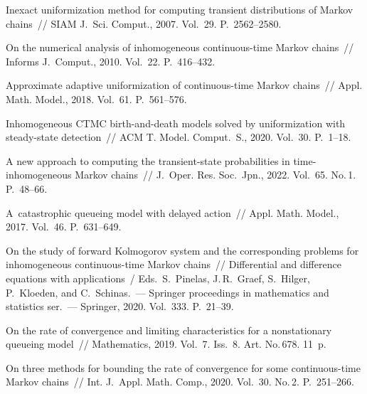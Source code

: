 \begin{multicols}{2}
        
        
        
        {\small\frenchspacing
 {%
 \begin{thebibliography}{99}
 
 Inexact uniformization method for 
computing transient distributions of Markov chains~// SIAM J.~Sci. Comput., 
2007. Vol.~29. P.~2562--2580.

 On the numerical analysis of 
inhomogeneous continuous-time Markov chains~// Informs J.~Comput., 2010. 
Vol.~22. P.~416--432.

 Approximate adaptive uniformization 
of continuous-time Markov chains~// Appl. Math. Model., 2018. Vol.~61. P.~561--576.

 Inhomogeneous CTMC birth-and-death models 
solved by uniformization with steady-state detection~// ACM T. Model. 
Comput.~S., 2020. Vol.~30. P.~1--18.



 A new approach to computing the transient-state probabilities in 
time-inhomogeneous Markov chains~// J.~Oper. Res. Soc.~Jpn., 2022. Vol.~65. No.\,1. P.~48--66.


 A~catastrophic queueing model with delayed action~// 
Appl. Math. Model., 2017. Vol.~46. P.~631--649.

 On the study of forward Kolmogorov system and the 
corresponding problems for inhomogeneous continuous-time Markov chains~//
Differential and difference equations with applications~/
 Eds.\ S.~Pinelas, J.\,R.~Graef, S.~Hilger, P.~Kloeden, and C.~Schinas.~--- 
Springer proceedings in mathematics and statistics ser.~--- Springer, 2020. Vol.~333. P.~21--39.

 On the rate of convergence and 
limiting characteristics for a nonstationary queueing model~// Mathematics, 
2019. Vol.~7. Iss.~8. Art. No.\,678. 11~p.

On three methods for bounding the rate of convergence for some continuous-time 
Markov chains~// Int. J.~Appl. Math. Comp., 2020. Vol.~30. No.\,2. P.~251--266.




\end{thebibliography}}}
\end{multicols}
